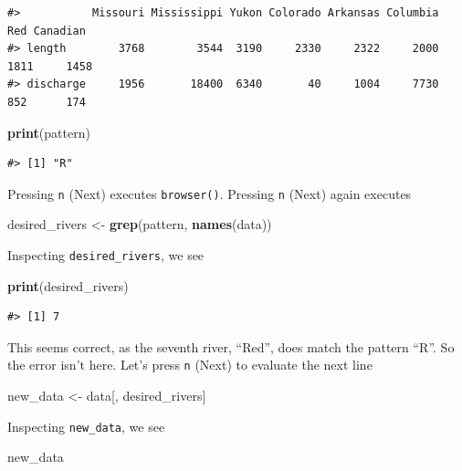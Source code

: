\documentclass[
]{book}
\newenvironment{Shaded}{\begin{snugshade}}{\end{snugshade}}
\newcommand{\KeywordTok}[1]{\textcolor[rgb]{0.13,0.29,0.53}{\textbf{#1}}}
\newcommand{\NormalTok}[1]{#1}
\newcommand{\StringTok}[1]{\textcolor[rgb]{0.31,0.60,0.02}{#1}}
\begin{document}
\begin{verbatim}
#>           Missouri Mississippi Yukon Colorado Arkansas Columbia  Red Canadian
#> length        3768        3544  3190     2330     2322     2000 1811     1458
#> discharge     1956       18400  6340       40     1004     7730  852      174
\end{verbatim}

\begin{Shaded}
\begin{Highlighting}[]
\KeywordTok{print}\NormalTok{(pattern)}
\end{Highlighting}
\end{Shaded}

\begin{verbatim}
#> [1] "R"
\end{verbatim}

Pressing \texttt{n} (Next) executes \texttt{browser()}. Pressing \texttt{n} (Next) again executes

\begin{Shaded}
\begin{Highlighting}[]
\NormalTok{desired_rivers <-}\StringTok{ }\KeywordTok{grep}\NormalTok{(pattern, }\KeywordTok{names}\NormalTok{(data))}
\end{Highlighting}
\end{Shaded}

Inspecting \texttt{desired\_rivers}, we see

\begin{Shaded}
\begin{Highlighting}[]
\KeywordTok{print}\NormalTok{(desired_rivers)}
\end{Highlighting}
\end{Shaded}

\begin{verbatim}
#> [1] 7
\end{verbatim}

This seems correct, as the seventh river, ``Red'', does match the pattern ``R''. So the error isn't here. Let's press \texttt{n} (Next) to evaluate the next line

\begin{Shaded}
\begin{Highlighting}[]
\NormalTok{new_data <-}\StringTok{ }\NormalTok{data[, desired_rivers]}
\end{Highlighting}
\end{Shaded}

Inspecting \texttt{new\_data}, we see

\begin{Shaded}
\begin{Highlighting}[]
\NormalTok{new_data}
\end{Highlighting}
\end{Shaded}
\end{document}

